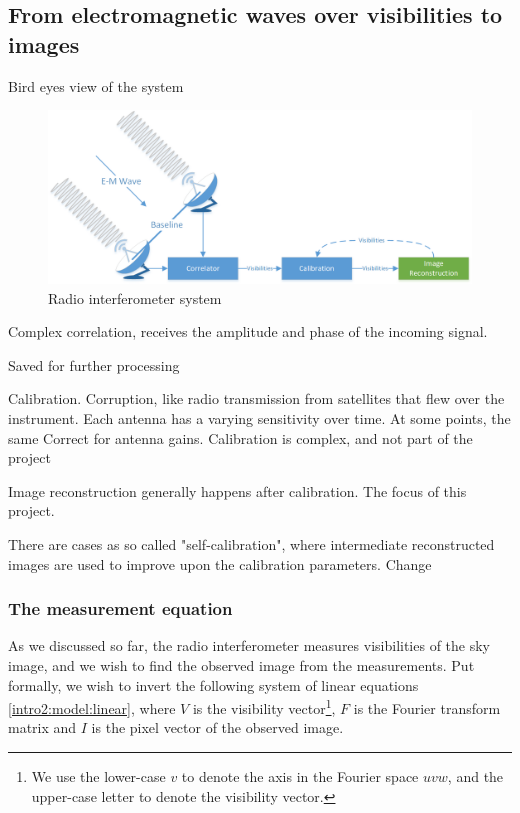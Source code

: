 \subsection{From electromagnetic waves over visibilities to images}
Bird eyes view of the system

\begin{figure}[h]
	\centering
	\includegraphics[width=0.80\linewidth]{./chapters/01.intro/system.png}
	\caption{Radio interferometer system}
	\label{intro:system}
\end{figure}

Complex correlation, receives the amplitude and phase of the incoming signal.

Saved for further processing

Calibration.
Corruption, like radio transmission from satellites that flew over the instrument.
Each antenna has a varying sensitivity over time. At some points, the same 
Correct for antenna gains.
Calibration is complex, and not part of the project

Image reconstruction generally happens after calibration. The focus of this project.

There are cases as so called "self-calibration", where intermediate reconstructed images are used to improve upon the calibration parameters.
Change

\subsubsection{The measurement equation}
As we discussed so far, the radio interferometer measures visibilities of the sky image, and we wish to find the observed image from the measurements. Put formally, we wish to invert the following system of linear equations \eqref{intro2:model:linear}, where $V$ is the visibility vector\footnote{We use the lower-case $v$ to denote the axis in the Fourier space $uvw$, and the upper-case letter to denote the visibility vector.}, $F$ is the Fourier transform matrix and $I$ is the pixel vector of the observed image.

